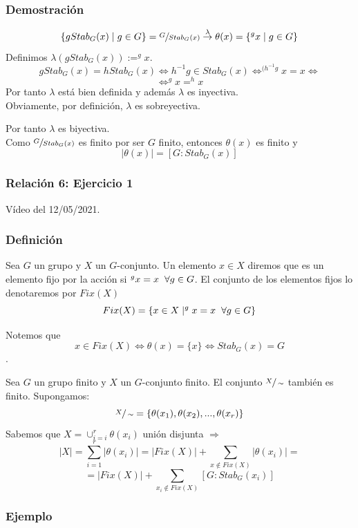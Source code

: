 \documentclass[11pt,a4paper]{article}
\begin{document}
\subsubsection*{Demostración}

$$\{g Stab_{G}(x) \mid g \in G\} = \sfrac{G}{Stab_{G}(x)} \overset{\lambda}{\to} \theta(x) = \{^{g}x \mid g \in G\}$$
Definimos $\lambda(g Stab_{G}(x)) := ^{g}x$.
$$g Stab_{G}(x) = h Stab_{G}(x) \iff h^{-1}g \in Stab_{G}(x) \iff ^{(h^{-1}g}x = x \iff$$ $$\iff ^{g}x = ^{h}x$$
Por tanto $\lambda$ está bien definida y además $\lambda$ es inyectiva. \\
Obviamente, por definición, $\lambda$ es sobreyectiva.

Por tanto $\lambda$ es biyectiva. \\
Como $\sfrac{G}{Stab_{G}(x)}$ es finito por ser $G$ finito, entonces $\theta(x)$ es finito y
$$|\theta(x)| = [G : Stab_{G}(x)]$$

\subsubsection*{Relación 6: Ejercicio 1}

Vídeo del 12/05/2021.

\subsubsection*{Definición}

Sea $G$ un grupo y $X$ un $G$-conjunto. Un elemento $x \in X$ diremos que es un elemento fijo por la acción si $^{g}x = x \hspace{0.2cm} \forall g \in G$. El conjunto de los elementos fijos lo denotaremos por $Fix(X)$
$$Fix(X) = \{x \in X \mid ^{g}x = x \hspace{0.2cm} \forall g \in G\}$$

Notemos que
$$x \in Fix(X) \iff \theta(x) = \{x\} \iff Stab_{G}(x) = G$$.

Sea $G$ un grupo finito y $X$ un $G$-conjunto finito. El conjunto $\sfrac{X}{\sim}$ también es finito. Supongamos:
$$\sfrac{X}{\sim} = \{\theta(x_{1}), \theta(x_{2}), ..., \theta(x_{r})\}$$
Sabemos que $X = \cup_{i = i}^{r} \theta(x_{i})$ unión disjunta $\Rightarrow$
$$|X| = \sum_{i=1}^{r} |\theta(x_{i})| = |Fix(X)| + \sum_{x \notin Fix(X)} |\theta(x_{i})| =$$ $$= |Fix(X)| + \sum_{x_{i} \notin Fix(X)} [G : Stab_{G}(x_{i})]$$

\subsubsection*{Ejemplo}
\end{document}
